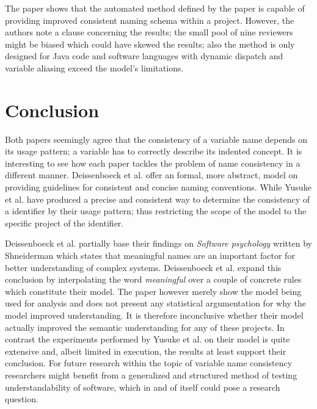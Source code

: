 \documentclass[a4paper,12pt]{article}
\begin{document}
\begin{multicols}{2}
    The paper shows that the automated method defined by the paper is capable of providing improved consistent naming
    schema within a project. However, the authors note a clause concerning the results; the small pool of nine
    reviewers
    might be biased which could have skewed the results; also the method is only designed for Java code and software
    languages with dynamic dispatch and variable aliasing exceed the model's limitations.

    \section*{Conclusion}
    Both papers seemingly agree that the consistency of a variable name depends on its usage pattern; a variable has
    to
    correctly describe its indented concept. It is interesting to see how each paper tackles the problem of name
    consistency in a different manner. Deissenboeck et al. offer an formal, more abstract, model on providing
    guidelines
    for consistent and concise naming conventions.\cite{deisenbock_concise_2005} While Yusuke et al. have produced a
    precise and consistent way to determine the consistency of a identifier by their usage pattern; thus restricting
    the
    scope of the model to the specific project of the identifier.\cite{shinyama_improving_2021}

    Deissenboeck et al. partially base their findings on \textit{Software psychology} written by Shneiderman which
    states
    that meaningful names are an important factor for better understanding of complex
    systems.\cite{schneiderman_software_1980} Deissenboeck et al. expand this conclusion by interpolating the word
    \textit{meaningful} over a couple of concrete rules which constitute their model.\cite{deisenbock_concise_2005} The
    paper however merely show the model being used for analysis and does not present any statistical argumentation for
    why
    the model improved understanding. It is therefore inconclusive whether their model actually improved the semantic
    understanding for any of these projects. In contrast the experiments performed by Yusuke et al. on their model is
    quite
    extensive and, albeit limited in execution, the results at least support their conclusion. For future research
    within
    the topic of variable name consistency researchers might benefit from a generalized and structured method of
    testing
    understandability of software, which in and of itself could pose a research question.


\end{multicols}
\end{document}
